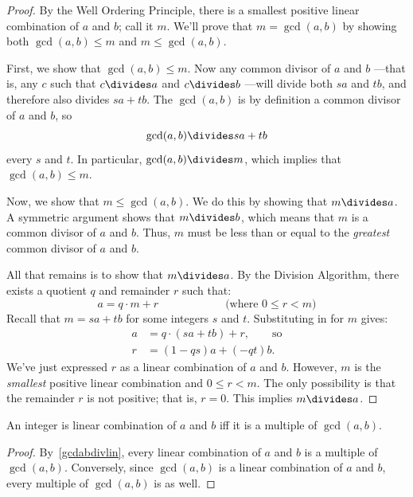 \begin{proof}
By the Well Ordering Principle, there is a smallest positive linear
combination of $a$ and $b$; call it $m$.  We'll prove that $m = \gcd(a,
b)$ by showing both $\gcd(a, b) \leq m$ and $m \leq \gcd(a, b)$.

First, we show that $\gcd(a, b) \leq m$.  Now any common divisor of
$a$ and $b$ ---that is, any $c$ such that $c \divides a$ and
$c \divides b$ ---will divide both $sa$ and $tb$, and therefore also
divides $sa+tb$.  The $\gcd(a, b)$ is by definition a common divisor
of $a$ and $b$, so
%
\begin{equation}\label{gcdabdivlin}
\gcd(a, b) \divides s a + t b
\end{equation}
every $s$ and $t$.
%
In particular, $\gcd(a, b) \divides m$, which implies that $\gcd(a, b)
\leq m$.

Now, we show that $m \leq \gcd(a, b)$.  We do this by showing that $m
\divides a$.  A symmetric argument shows that $m \divides b$, which means
that $m$ is a common divisor of $a$ and $b$.  Thus, $m$ must be less than
or equal to the \emph{greatest} common divisor of $a$ and $b$.

All that remains is to show that $m \divides a$.  By the Division
Algorithm, there exists a quotient $q$ and remainder $r$ such that:
%
\[
a = q \cdot m + r \hspace{1in} \text{(where $0 \leq r < m$)}
\]
%
Recall that $m = s a + t b$ for some integers $s$ and $t$.
Substituting in for $m$ gives:
%
\begin{align*}
a & = q \cdot (s a + t b) + r, \qquad \text{so} \\
r & = (1 - qs) a + (-qt) b.
\end{align*}
%
We've just expressed $r$ as a linear combination of $a$ and $b$.
However, $m$ is the \emph{smallest} positive linear combination and
$0 \leq r < m$.  The only possibility is that the remainder $r$ is not
positive; that is, $r = 0$.  This implies $m \divides a$.
\end{proof}

\begin{corollary}\label{cor:lin-comb}
An integer is linear combination of $a$ and $b$ iff it is a multiple
of $\gcd(a, b)$.
\end{corollary}

\begin{proof}
By~\eqref{gcdabdivlin}, every linear combination of $a$ and $b$ is a
multiple of $\gcd(a, b)$.  Conversely, since $\gcd(a, b)$ is a linear
combination of $a$ and $b$, every multiple of $\gcd(a, b)$ is as well.
\end{proof}

